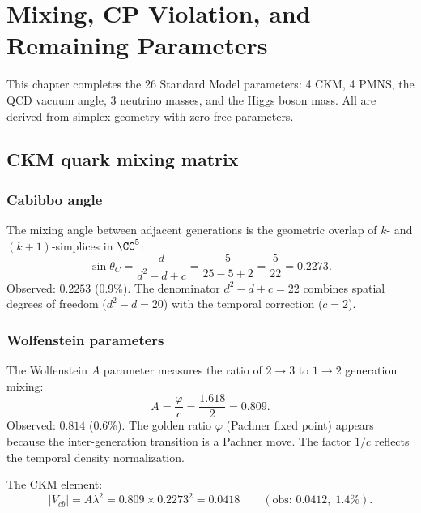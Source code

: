 \section{Mixing, CP Violation, and Remaining Parameters}
\label{ch:mixing}

This chapter completes the 26 Standard Model parameters: 4 CKM, 4 PMNS, the QCD vacuum angle, 3 neutrino masses, and the Higgs boson mass. All are derived from simplex geometry with zero free parameters.

\subsection{CKM quark mixing matrix}

\subsubsection{Cabibbo angle}

The mixing angle between adjacent generations is the geometric overlap of $k$- and $(k+1)$-simplices in $\CC^5$:
\begin{equation}
\sin\theta_C = \frac{d}{d^2 - d + c} = \frac{5}{25 - 5 + 2} = \frac{5}{22} = 0.2273.
\end{equation}
Observed: $0.2253$ (0.9\%). The denominator $d^2 - d + c = 22$ combines spatial degrees of freedom ($d^2 - d = 20$) with the temporal correction ($c = 2$).

\subsubsection{Wolfenstein parameters}

The Wolfenstein $A$ parameter measures the ratio of $2 \to 3$ to $1 \to 2$ generation mixing:
\begin{equation}
A = \frac{\varphi}{c} = \frac{1.618}{2} = 0.809.
\end{equation}
Observed: $0.814$ (0.6\%). The golden ratio $\varphi$ (Pachner fixed point) appears because the inter-generation transition is a Pachner move. The factor $1/c$ reflects the temporal density normalization.

The CKM element:
\begin{equation}
|V_{cb}| = A\lambda^2 = 0.809 \times 0.2273^2 = 0.0418 \qquad (\text{obs: } 0.0412,\; 1.4\%).
\end{equation}

